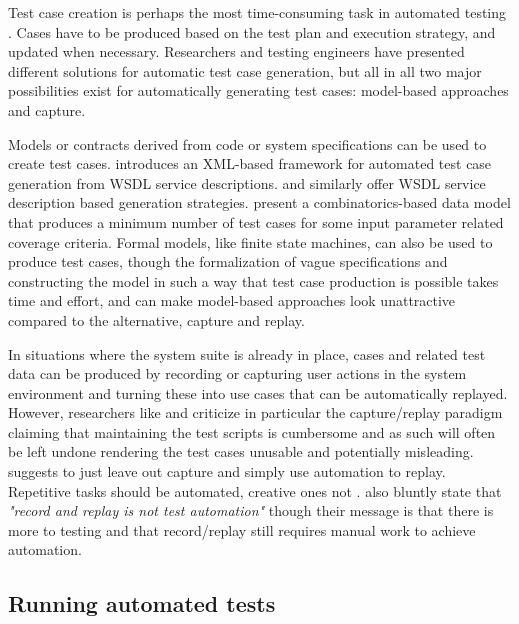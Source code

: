 \documentclass[12pt,a4paper,oneside,pdftex]{report}
\begin{document}
Test case creation is perhaps the most time-consuming task in automated testing \citep{kit1999integrated}. Cases have to be produced based on the test plan and execution strategy, and updated when necessary. Researchers and testing engineers have presented different solutions for automatic test case generation, but all in all two major possibilities exist for automatically generating test cases: model-based approaches and capture.

Models or contracts derived from code or system specifications can be used to create test cases. \citet{tsai2002coyote} introduces an XML-based framework for automated test case generation from WSDL service descriptions. \citet{bai2005WSDL} and \citet{di2007web} similarly offer WSDL service description based generation strategies. \citet{dalal1999model} present a combinatorics-based data model that produces a minimum number of test cases for some input parameter related coverage criteria. Formal models, like finite state machines, can also be used to produce test cases, though the formalization of vague specifications and constructing the model in such a way that test case production is possible takes time and effort, and can make model-based approaches look unattractive compared to the alternative, capture and replay. 

In situations where the system suite is already in place, cases and related test data can be produced by recording or capturing user actions in the system environment and turning these into use cases that can be automatically replayed. However, researchers like \citet{zallar2001you} and \citet{kit1999integrated} criticize in particular the capture/replay paradigm claiming that maintaining the test scripts is cumbersome and as such will often be left undone rendering the test cases unusable and potentially misleading. \citet{kit1999integrated} suggests to just leave out capture and simply use automation to replay. Repetitive tasks should be automated, creative ones not \citep{pezze2008software}. \citet{fewster1999software} also bluntly state that \emph{"record and replay is not test automation"} though their message is that there is more to testing and that record/replay still requires manual work to achieve automation. 

\subsection{Running automated tests}
\end{document}
